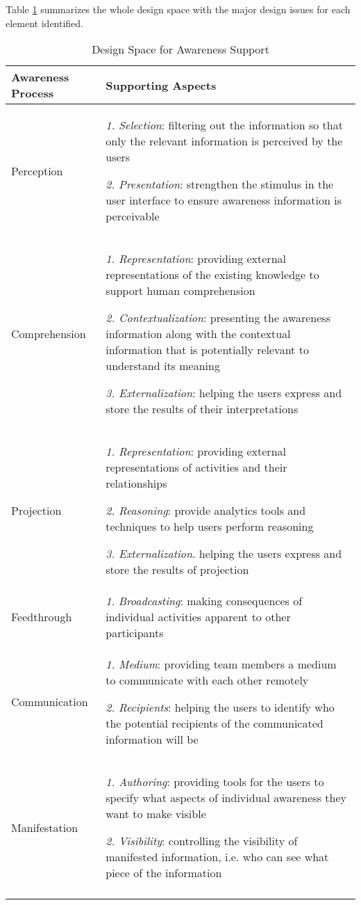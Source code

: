 Table \ref{tab:design_space} summarizes the whole design space with the major design issues for each element identified.

{\footnotesize
	\begin{longtable}{>{\raggedright}m{1.2in}>{\raggedright}p{4in}}
\toprule 
\textbf{Awareness Process} & \textbf{Supporting Aspects}\tabularnewline
\midrule 
Perception & \emph{1. Selection}: filtering out the information so that only the
relevant information is perceived by the users

\emph{2. Presentation}: strengthen the stimulus in the user interface
to ensure awareness information is perceivable\tabularnewline
\midrule 
Comprehension & \emph{1. Representation}: providing external representations of the
existing knowledge to support human comprehension

\emph{2. Contextualization}: presenting the awareness information
along with the contextual information that is potentially relevant
to understand its meaning

\emph{3. Externalization}: helping the users express and store the
results of their interpretations\tabularnewline
\midrule 
Projection & \emph{1. Representation}: providing external representations of activities
and their relationships 

\emph{2. Reasoning}: provide analytics tools and techniques to help
users perform reasoning

\emph{3. Externalization}. helping the users express and store the
results of projection\tabularnewline
\midrule 
Feedthrough & \emph{1. }\textit{Broadcasting}: making consequences of individual
activities apparent to other participants\tabularnewline
\midrule 
Communication & \textit{1. Medium}: providing team members a medium to communicate
with each other remotely

\textit{2. Recipients}: helping the users to identify who the potential
recipients of the communicated information will be \tabularnewline
\midrule 
Manifestation & \textit{1. Authoring}: providing tools for the users to specify what
aspects of individual awareness they want to make visible

\textit{2. Visibility}: controlling the visibility of manifested information,
i.e. who can see what piece of the information\tabularnewline
\bottomrule

\caption{Design Space for Awareness Support}
\label{tab:design_space}

\end{longtable}	
}

